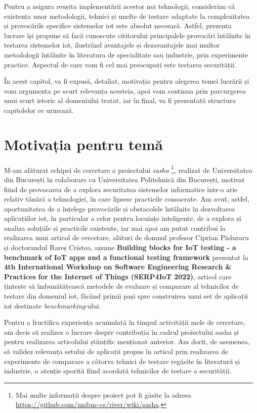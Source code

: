 Pentru a asigura reușita implementării acestor noi tehnologii, considerăm că existența unor metodologii, tehnici și unelte de testare adaptate la complexitatea și provocările specifice sistemelor \acrshort{iot} este absolut necesară. Astfel, prezenta lucrare își propune să facă cunoscute cititorului principalele provocări întâlnite în testarea sistemelor \acrshort{iot}, ilustrând avantajele și dezavantajele mai multor metodologii întâlnite în literatura de specialitate sau industrie, prin experimente practice. Aspectul de care vom fi cel mai preocupați este testarea securității.

În acest capitol, va fi expusă, detaliat, motivația pentru alegerea temei lucrării și vom argumenta pe scurt relevanța acesteia, apoi vom continua prin parcurgerea unui scurt istoric al domeniului tratat, iar în final, va fi prezentată structura capitolelor ce urmează.

\section{Motivația pentru temă}

M-am alăturat echipei de cercetare a proiectului \textit{\acrfull{sasha}} \footnote{Mai multe informații despre proiect pot fi găsite la adresa \url{https://github.com/unibuc-cs/river/wiki/sasha}.}, realizat de Universitatea din București în colaborare cu Universitatea Politehnică din București, motivat fiind de provocarea de a explora securitatea sistemelor informatice într-o arie relativ tânără a tehnologiei, în care lipsesc practicile consacrate. Am avut, astfel, oportunitatea de a înțelege provocările și obstacolele întâlnite în dezvoltarea aplicațiilor \acrshort{iot}, în particular a celor pentru locuințe inteligente, de a explora și analiza soluțiile și practicile existente, iar mai apoi am putut contribui la realizarea unui articol de cercetare, alături de domnul profesor Ciprian Păduraru și doctorandul Rareș Cristea, anume \textbf{Building blocks for IoT testing - a benchmark of IoT apps and a functional testing framework} prezentat la \textbf{4th International Workshop on Software Engineering Research \& Practices for the Internet of Things (SERP4IoT 2022)}, articol care țintește să îmbunătățească metodele de evaluare și comparare al tehnicilor de testare din domeniul \acrlong{iot}, făcând primii pași spre construirea unui set de aplicații \acrshort{iot} destinate \textit{benchmarking}-ului.

Pentru a fructifica experiența acumulată în timpul activității mele de cercetare, am decis să realizez o lucrare despre contribuția în cadrul proiectului \acrshort{sasha} și pentru realizarea articolului științific menționat anterior. Am dorit, de asemenea, să validez relevanța setului de aplicații propus în articol prin realizarea de experimente de comparare a câtorva tehnici de testare regăsite în literatură și industrie, o atenție sporită fiind acordată tehnicilor de testare a securității.

